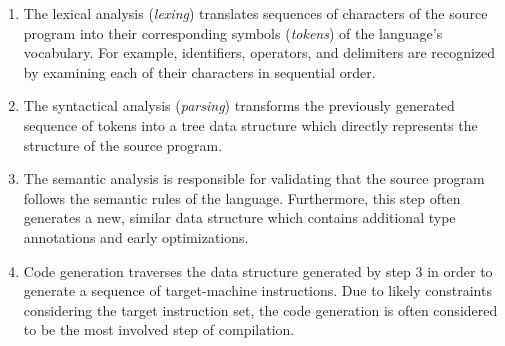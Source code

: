 \begin{enumerate}
	\item The lexical analysis (\emph{lexing}) translates sequences of characters of the source program
	      into their corresponding symbols (\emph{tokens}) of the language's vocabulary.
	      For example, identifiers, operators, and delimiters are recognized
	      by examining each of their characters in sequential order.
	\item The syntactical analysis (\emph{parsing}) transforms the previously generated sequence of tokens
	      into a tree data structure which directly represents the structure of the source program.
	\item The semantic analysis is responsible for validating
	      that the source program follows the semantic rules of the language.
	      Furthermore, this step often generates a new, similar data structure which contains additional type annotations and early optimizations.
	\item Code generation traverses the data structure generated by step 3
	      in order to generate a sequence of target-machine instructions.
	      Due to likely constraints considering the target instruction set,
	      the code generation is often considered to be the most involved step of compilation.
\end{enumerate}
\cite[pp.~6--7]{wirth_compiler_construction_2005}
